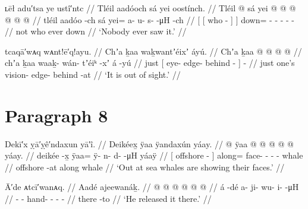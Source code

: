 \ex\label{ex:90-95-nobody-ever-saw-it}%
%
\begingl
	\glpreamble	ʟēł adu′tsa ye ustî′ntc //
	\glpreamble	Tléil aadóoch sá yei oostínch. //
	\gla	Tléil {} {}  @ {} {} sá {}
		yei @  @ {} @ {} @ {} @ {} @ {} //
	\glb	tléil {} {} aadóo -ch {} sá {}
		yei= a- u- s-  -μH -ch //
	\glc	{} {}[ {}[ who - {}]  {}]
		down= - - -  - - //
	\gld	not {} {} who {} {} ever {}
		down  {} {} {} {} {} //
	\glft	‘Nobody ever saw it.’
		//
\endgl
\xe

\ex\label{ex:90-96-out-of-sight}%
%
\begingl
	\glpreamble	tcaqā′wᴀq wᴀnt!ē′q!ayu. //
	\glpreamble	Chʼa ḵaa waḵwantʼéixʼ áyú. //
	\gla	Chʼa {} ḵaa  @ {} @ {} @ {} {}  @ {} //
	\glb	chʼa {} ḵaa waaḵ- wán- tʼéiᵏ -xʼ {} á -yú //
	\glc	just {}[  eye- edge- behind - {}]  - //
	\gld	just {} one’s vision- edge- behind -at {}  {} //
	\glft	‘It is out of sight.’
		//
\endgl
\xe

\section{Paragraph 8}\label{sec:90-para-8}

\ex\label{ex:90-97-whales-show-faces}%
%
\begingl
	\glpreamble	Dekī′x ỵā′ỵê′ndaxun yā′î. //
	\glpreamble	Deikéex̱ ÿaa ÿandaxún yáay. //
	\gla	{}  @ {} {}
		ÿaa @  @ {} @ {} @ {} @ {}
		{} yáay. {} //
	\glb	{} deikée -x̱ {}
		ÿaa= ÿ- n- d-  -μH
		{} yáaÿ {} //
	\glc	{}[ offshore - {}]
		along= face- - -  -
		{} whale {} //
	\gld	{} offshore -at {}
		along  {} {} {} {}
		{} whale {} //
	\glft	‘Out at sea whales are showing their faces.’
		//
\endgl
\xe

\ex\label{ex:90-98-release-it-there}%
%
\begingl
	\glpreamble	Ā′de ᴀtcī′wanᴀq. //
	\glpreamble	Aadé ajeewanáḵ. //
	\gla	{}  @ {} {}
		 @ {} @ {} @ {} @ {} @ {} //
	\glb	{} á -dé {}
		a- ji- wu- i-  -μH //
	\glc	{}  - {}
		- hand- - -  - //
	\gld	{} there -to {}
		 {} {} {} {} {} //
	\glft	‘He released it there.’
		//
\endgl
\xe

